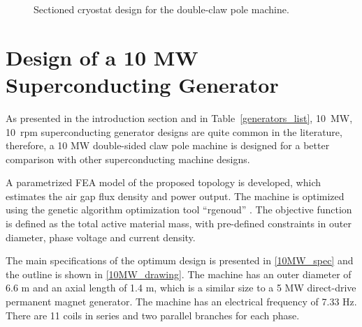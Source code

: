 \documentclass[12pt]{iopart}
\begin{document}
\begin{figure}[]
    \caption{Sectioned cryostat design for the double-claw pole machine.} 
    \label{cryostat_variants}
\end{figure}

\section{Design of a 10 MW Superconducting Generator}
 
As presented in the introduction section and in Table~\ref{generators_list}, 10~MW, 10~rpm superconducting generator designs are quite common in the literature, therefore, a 10 MW double-sided claw pole machine is designed for a better comparison with other superconducting machine designs.

A parametrized FEA model of the proposed topology is developed, which estimates the air gap flux density and power output. The machine is optimized using the genetic algorithm optimization tool ``rgenoud'' \cite{Mebane2011}. 
The objective function is defined as the total active material mass, with pre-defined constraints in outer diameter, phase voltage and current density.


The main specifications of the optimum design is presented in \ref{10MW_spec} and the outline is shown in \ref{10MW_drawing}. The machine has an outer diameter of 6.6 m and an axial length of 1.4 m, which is a similar size to a 5 MW direct-drive permanent magnet generator. The machine has an electrical frequency of 7.33 Hz. There are 11 coils in series and two parallel branches for each phase.
\end{document}
